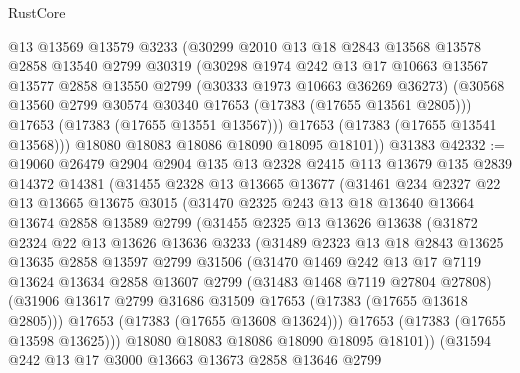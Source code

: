 \begin{lexlean}{RustCore}
\begin{coremodule}
        @13
        @13569
        @13579
        @3233
        (@30299
          @2010
          @13
          @18
          @2843
          @13568
          @13578
          @2858
          @13540
          @2799
          @30319
          (@30298
            @1974
            @242
            @13
            @17
            @10663
            @13567
            @13577
            @2858
            @13550
            @2799
            (@30333 @1973 @10663 @36269 @36273)
            (@30568 @13560 @2799 @30574 @30340 @17653 (@17383 (@17655 @13561 @2805)))
            @17653
            (@17383 (@17655 @13551 @13567)))
          @17653
          (@17383 (@17655 @13541 @13568)))
        @18080
        @18083
        @18086
        @18090
        @18095
        @18101))
    @31383
@42332 := @19060
    @26479
    @2904
    @2904
    @135
    @13
    @2328
    @2415
    @113
    @13679
    @135
    @2839
    @14372
    @14381
    (@31455
      @2328
      @13
      @13665
      @13677
      (@31461
        @234
        @2327
        @22
        @13
        @13665
        @13675
        @3015
        (@31470
          @2325
          @243
          @13
          @18
          @13640
          @13664
          @13674
          @2858
          @13589
          @2799
          (@31455
            @2325
            @13
            @13626
            @13638
            (@31872
              @2324
              @22
              @13
              @13626
              @13636
              @3233
              (@31489
                @2323
                @13
                @18
                @2843
                @13625
                @13635
                @2858
                @13597
                @2799
                @31506
                (@31470
                  @1469
                  @242
                  @13
                  @17
                  @7119
                  @13624
                  @13634
                  @2858
                  @13607
                  @2799
                  (@31483 @1468 @7119 @27804 @27808)
                  (@31906 @13617 @2799 @31686 @31509 @17653 (@17383 (@17655 @13618 @2805)))
                  @17653
                  (@17383 (@17655 @13608 @13624)))
                @17653
                (@17383 (@17655 @13598 @13625)))
              @18080
              @18083
              @18086
              @18090
              @18095
              @18101))
          (@31594
            @242
            @13
            @17
            @3000
            @13663
            @13673
            @2858
            @13646
            @2799

\end{coremodule}
\end{lexlean}
